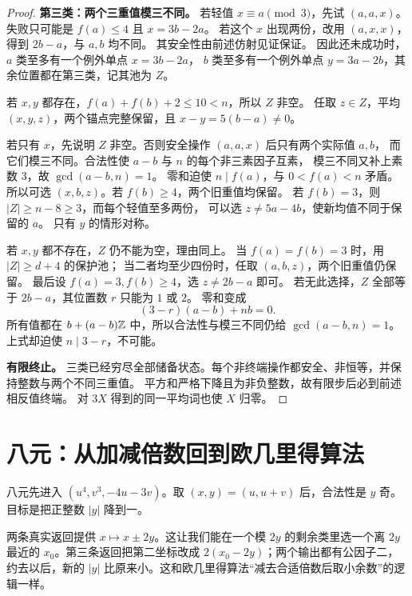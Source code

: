 \begin{proof}
\par\noindent\textbf{第三类：两个三重值模三不同。}
若轻值 $x\equiv a\pmod3$，先试 $(a,a,x)$。
失败只可能是 $f(a)\le4$ 且 $x=3b-2a$。
若这个 $x$ 出现两份，改用 $(a,x,x)$，得到 $2b-a$，与 $a,b$ 均不同。
其安全性由前述仿射见证保证。
因此还未成功时，$a$ 类至多有一个例外单点 $x=3b-2a$，
$b$ 类至多有一个例外单点 $y=3a-2b$，其余位置都在第三类，记其池为 $Z$。

若 $x,y$ 都存在，$f(a)+f(b)+2\le10<n$，所以 $Z$ 非空。
任取 $z\in Z$，平均 $(x,y,z)$，两个锚点完整保留，且 $x-y=5(b-a)\ne0$。

若只有 $x$，先说明 $Z$ 非空。否则安全操作 $(a,a,x)$ 后只有两个实际值 $a,b$，
而它们模三不同。合法性使 $a-b$ 与 $n$ 的每个非三素因子互素，
模三不同又补上素数 $3$，故 $\gcd(a-b,n)=1$。
零和迫使 $n\mid f(a)$，与 $0<f(a)<n$ 矛盾。
所以可选 $(x,b,z)$。若 $f(b)\ge4$，两个旧重值均保留。
若 $f(b)=3$，则 $|Z|\ge n-8\ge3$，而每个轻值至多两份，
可以选 $z\ne5a-4b$，使新均值不同于保留的 $a$。
只有 $y$ 的情形对称。

若 $x,y$ 都不存在，$Z$ 仍不能为空，理由同上。
当 $f(a)=f(b)=3$ 时，用 $|Z|\ge d+4$ 的保护池；
当二者均至少四份时，任取 $(a,b,z)$，两个旧重值仍保留。
最后设 $f(a)=3,f(b)\ge4$，选 $z\ne2b-a$ 即可。
若无此选择，$Z$ 全部等于 $2b-a$，其位置数 $r$ 只能为 $1$ 或 $2$。
零和变成
\[
(3-r)(a-b)+nb=0.
\]
所有值都在 $b+(a-b)\mathbb Z$ 中，所以合法性与模三不同仍给 $\gcd(a-b,n)=1$。
上式却迫使 $n\mid3-r$，不可能。

\par\noindent\textbf{有限终止。}
三类已经穷尽全部储备状态。每个非终端操作都安全、非恒等，并保持整数与两个不同三重值。
平方和严格下降且为非负整数，故有限步后必到前述相反值终端。
对 $3X$ 得到的同一平均词也使 $X$ 归零。
\end{proof}

\section{八元：从加减倍数回到欧几里得算法}
八元先进入 $(u^4,v^3,-4u-3v)$。取 $(x,y)=(u,u+v)$ 后，合法性是 $y$ 奇。目标是把正整数 $|y|$ 降到一。

两条真实返回提供 $x\mapsto x\pm2y$。这让我们能在一个模 $2y$ 的剩余类里选一个离 $2y$ 最近的 $x_0$。第三条返回把第二坐标改成 $2(x_0-2y)$；两个输出都有公因子二，约去以后，新的 $|y|$ 比原来小。这和欧几里得算法“减去合适倍数后取小余数”的逻辑一样。

